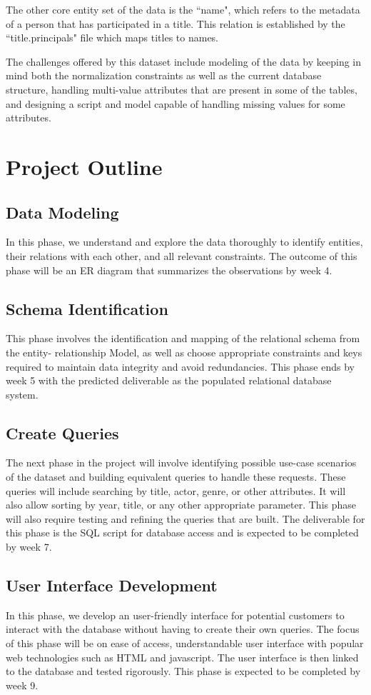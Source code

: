 \documentclass{sig-alternate}
\begin{document}
The other core entity set of the data is the ``name", which refers to the metadata of a person that has participated in a title. This relation is established by the ``title.principals" file which maps titles to names.

The challenges offered by this dataset include modeling of the data by keeping in mind both the normalization constraints as well as the current database structure, handling multi-value attributes that are present in some of the tables, and designing a script and model capable of handling missing values for some attributes.
\section{Project Outline}
\subsection{Data Modeling}
In this phase, we understand and explore the data thoroughly to identify entities, their relations with each other, and all relevant constraints. The outcome of this phase will be an ER diagram that summarizes the observations by week 4. 
\subsection{Schema Identification}
This phase involves the identification and mapping of the relational schema from the entity- relationship Model, as well as choose appropriate constraints and keys required to maintain data integrity and avoid redundancies. This phase ends by week 5 with the predicted deliverable as the populated relational database system.
\subsection{Create Queries}
The next phase in the project will involve identifying possible use-case scenarios of the dataset and building equivalent queries to handle these requests. These queries will include searching by title, actor, genre, or other attributes. It will also allow sorting by year, title, or any other appropriate parameter. This phase will also require testing and refining the queries that are built. The deliverable for this phase is the SQL script for database access and is expected to be completed by week 7.
\subsection{User Interface Development}
In this phase, we develop an user-friendly interface for potential customers to interact with the database without having to create their own queries. The focus of this phase will be on ease of access, understandable user interface with popular web technologies such as HTML and javascript. The user interface is then linked to the database and tested rigorously. This phase is expected to be completed by week 9.
\end{document}
